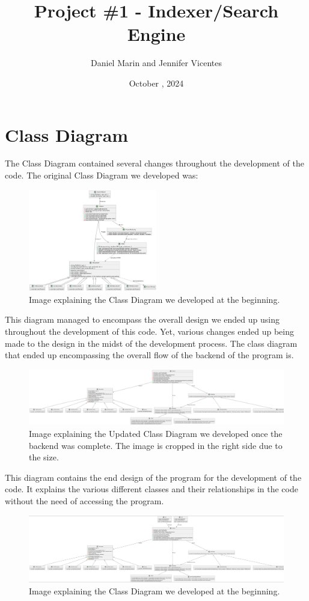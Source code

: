 \documentclass{article}
\title{Project \#1 - Indexer/Search Engine}
\author{Daniel Marin and Jennifer Vicentes}
\date{October , 2024}
\begin{document}
\maketitle
\tableofcontents
\section{Class Diagram}
The Class Diagram contained several changes throughout the development of the code. The original Class Diagram we developed was:
\begin{figure}[H]
    \centering
    \includegraphics[width=0.5\textwidth]{Image_OriginalClassDiagram.jpeg}
    \caption{Image explaining the Class Diagram we developed at the beginning.}
    \label{fig:OriginalClassDiagram}
\end{figure}
This diagram managed to encompass the overall design we ended up using throughout the development of this code. Yet, various changes ended up being made to the design in the midst of the development process. The class diagram that ended up encompassing the overall flow of the backend of the program is. 
\begin{figure}[H]
    \centering
    \includegraphics[width=\textwidth]{Image_UpdatedClassDiagram.png}
    \caption{Image explaining the Updated Class Diagram we developed once the backend was complete. The image is cropped in the right side due to the size.}
    \label{fig:UpdatedClassDiagram}
\end{figure}
This diagram contains the end design of the program for the development of the code. It explains the various different classes and their relationships in the code without the need of accessing the program.
\begin{figure}[H]
    \centering
    \includegraphics[width=\textwidth]{Image_CliGuiDiagram.png}
    \caption{Image explaining the Class Diagram we developed at the beginning.}
    \label{fig:FinalClassDiagram}
\end{figure}
\end{document}
